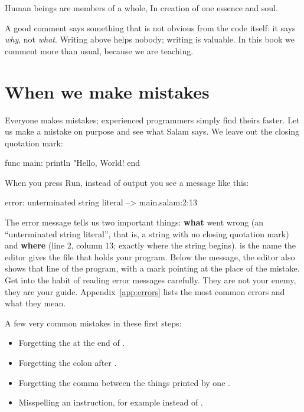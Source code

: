 \begin{salamout}
Human beings are members of a whole,
In creation of one essence and soul.
\end{salamout}

\begin{tip}
A good comment says something that is not obvious from the code itself: it
says \emph{why}, not \emph{what}. Writing  above
 helps nobody; writing  is valuable. In this book we comment more than
usual, because we are teaching.
\end{tip}

\section{When we make mistakes}

Everyone makes mistakes; experienced programmers simply find theirs faster.
Let us make a mistake on purpose and see what Salam says. We leave out the
closing quotation mark:

\begin{salamcode}
func main:
    println "Hello, World!
end
\end{salamcode}

When you press Run, instead of output you see a message like this:

\begin{salamout}
error: unterminated string literal
 --> main.salam:2:13
\end{salamout}

The error message tells us two important things: \textbf{what} went wrong
(an ``unterminated string literal'', that is, a string with no closing
quotation mark) and \textbf{where} (line 2, column 13; exactly where the
string begins).  is the name the editor gives the file that
holds your program. Below the message, the editor also shows that line of
the program, with a \code{\textasciicircum} mark pointing at the place of
the mistake. Get into the habit of reading error messages carefully. They
are not your enemy, they are your guide. Appendix~\ref{app:errors} lists the
most common errors and what they mean.

A few very common mistakes in these first steps:
\begin{itemize}
  \item Forgetting the  at the end of .
  \item Forgetting the colon after .
  \item Forgetting the comma between the things printed by one
        .
  \item Misspelling an instruction, for example  instead of
        .
\end{itemize}

